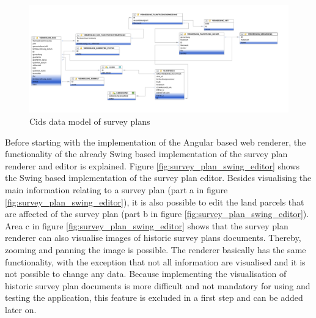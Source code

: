 \begin{figure}
	\centering	\includegraphics[width=1.0\textwidth]{./img/impl/surveyPlan_data_model.png}
	\caption{Cids data model of survey plans}
	\label{fig:survey_plan_data_model}
\end{figure}

Before starting with the implementation of the Angular based web renderer, the functionality of the already Swing based implementation of the survey plan renderer and editor is explained.
Figure \ref{fig:survey_plan_swing_editor} shows the Swing based implementation of the survey plan editor.
Besides visualising the main information relating to a survey plan (part a in figure \ref{fig:survey_plan_swing_editor}),  it is also possible to edit the land parcels that are affected of the survey plan (part b in figure \ref{fig:survey_plan_swing_editor}).
Area  c in figure \ref{fig:survey_plan_swing_editor} shows that the survey plan renderer can also visualise images of historic survey plans documents.
Thereby, zooming and panning the image is possible.
The renderer basically has the same functionality, with the exception that not all information are visualised and it is not possible to change any data.
Because implementing the visualisation of historic survey plan documents is more difficult and not mandatory for using and testing the application, this feature is excluded in a first step and can be added later on.

